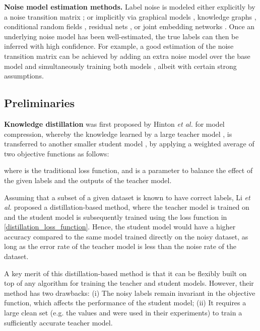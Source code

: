 \documentclass[conference]{IEEEtran}
\begin{document}
\noindent\textbf{Noise model estimation methods.}
Label noise is modeled either explicitly by a noise transition matrix \cite{hendrycks2018using, patrini2017making}; or implicitly via graphical models \cite{xiao2015learning}, knowledge graphs \cite{li2017learning}, conditional random fields \cite{Vahdat2017toward}, residual nets \cite{hu2019weakly}, or joint embedding networks \cite{lee2018cleannet}. 
Once an underlying noise model has been well-estimated, the true labels can then be inferred with high confidence. 
For example, a good estimation of the noise transition matrix can be achieved by adding an extra noise model over the base model and simultaneously training both models \cite{jindal2016learning, sukhbaatar2014training}, 
albeit with certain strong assumptions.


\subsection{Preliminaries}
\label{preliminaries}
\textbf{Knowledge distillation} was first proposed by Hinton \textit{et al.} \cite{hinton2015distilling} for model compression,  
whereby the knowledge learned by a large teacher model , is transferred to another smaller student model , by applying a weighted average of two objective functions as follows:
\vspace*{-0.1em}

\vspace*{-1.1em}

\noindent where  is the traditional loss function, and  is a parameter to balance the effect of the given labels and the outputs of the teacher model.

Assuming that a subset  of a given dataset is known to have correct labels, Li \textit{et al.} \cite{li2017learning} proposed a distillation-based method, where the teacher model  is trained on  and the student model  is subsequently trained using the loss function in \eqref{distillation_loss_function}. 
Hence, the student model would have a higher accuracy compared to the same model trained directly on the noisy dataset, as long as the error rate of the teacher model is less than the noise rate of the dataset.

A key merit of this distillation-based method is that it can be flexibly built on top of any algorithm for training the teacher and student models.
However, their method has two drawbacks: (i) The noisy labels remain invariant in the objective function, which affects the performance of the student model;
(ii) It requires a large clean set (e.g. the values  and  were used in their experiments) to train a sufficiently accurate teacher model. 
\end{document}
